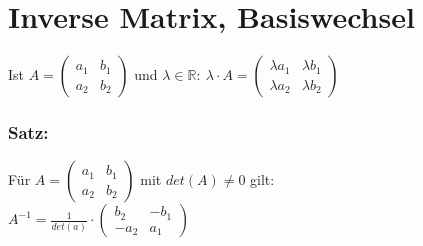 \section{Inverse Matrix, Basiswechsel}
Ist $A=\begin{pmatrix}a_{1} & b_{1} \\ a_{2} & b_{2} \end{pmatrix}$ und $\lambda \in \mathbb{R}: \ \lambda \cdot A = \begin{pmatrix} \lambda a_{1} & \lambda b_{1} \\ \lambda a_{2} & \lambda b_{2} \end{pmatrix}$\\
%
%
%
\subsubsection{Satz:}
Für $A=\begin{pmatrix}a_{1} & b_{1} \\ a_{2} & b_{2} \end{pmatrix}$ mit $det(A) \neq 0$ gilt:\\
$A^{-1} = \frac{1}{det(a)} \cdot \begin{pmatrix} b_{2} & -b_{1} \\ -a_{2} & a_{1} \end{pmatrix}$
%
%
%
